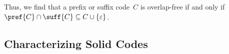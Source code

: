 Thus, we find that a prefix or suffix code~$C$
is overlap-free if and only if $\pref{C} \cap \suff{C} \subseteq C \cup \{\varepsilon\}$.

\subsection{Characterizing Solid Codes}
\label{constrsync:sec:codes:solid}

